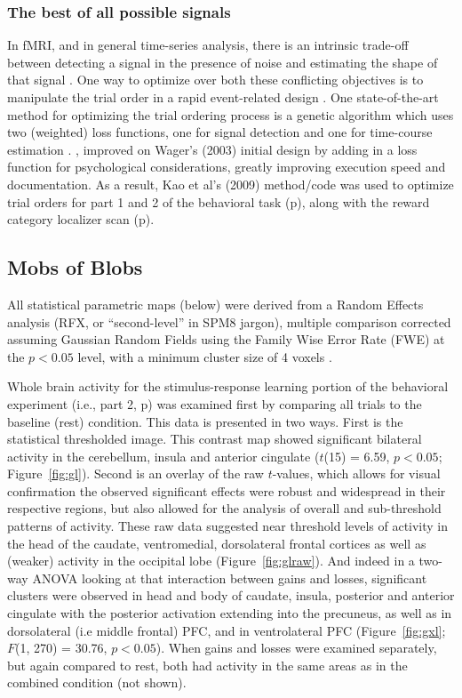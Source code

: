 \documentclass[doc,12pt]{apa}        %
\begin{document}
\subsubsection{The best of all possible signals}
\label{subsub:bestsignal}
In fMRI, and in general time-series analysis, there is an intrinsic trade-off between detecting a signal in the presence of noise and estimating the shape of that signal \cite{Dale:1999p7901,Birn:2002p1777,Liu:2004p2141}.   One way to optimize over both these conflicting objectives is to manipulate the trial order in a rapid event-related design \cite{Miezin:2000p7924}.  One state-of-the-art method for optimizing the trial ordering process is a genetic algorithm which uses two (weighted) loss functions, one for signal detection and one for time-course estimation \cite{Wager:2003p2980}. , improved on Wager's (2003) initial design by adding in a loss function for psychological considerations, greatly improving execution speed and documentation.  As a result, Kao et al's (2009) method/code was used to optimize trial orders for part 1 and 2 of the behavioral task (p\pageref{subsub:whatwhen}), along with the reward category localizer scan (p\pageref{subsub:datadetails}).

\subsection{Mobs of Blobs}
\label{sub:blob}
All statistical parametric maps (below) were derived from a Random Effects analysis (RFX, or ``second-level'' in SPM8 jargon), multiple comparison corrected assuming Gaussian Random Fields using the Family Wise Error Rate (FWE) at the $p < 0.05$ level, with a minimum cluster size of 4 voxels \cite{Worsley:1996p9367}. 

Whole brain activity for the stimulus-response learning portion of the behavioral experiment (i.e., part 2, p\pageref{subsub:whatwhen}) was examined first by comparing all trials to the baseline (rest) condition.  This data is presented in two ways. First is the statistical thresholded image.  This contrast map showed significant bilateral activity in the cerebellum, insula and anterior cingulate ($t$(15) = 6.59, $p< 0.05$; Figure~\ref{fig:gl}).  Second is an overlay of the raw $t$-values, which allows for visual confirmation the observed significant effects were robust and widespread in their respective regions, but also allowed for the analysis of overall and sub-threshold patterns of activity.  These raw data suggested near threshold levels of activity in the head of the caudate, ventromedial, dorsolateral frontal cortices as well as (weaker) activity in the occipital lobe (Figure~\ref{fig:glraw}).  And indeed in a two-way ANOVA looking at that interaction between gains and losses, significant clusters were observed in head and body of caudate, insula, posterior and anterior cingulate with the posterior activation extending into the precuneus, as well as in dorsolateral (i.e middle frontal) PFC, and in ventrolateral PFC (Figure~\ref{fig:gxl}; $F$(1, 270) = 30.76, $p < 0.05$).  When gains and losses were examined separately, but again compared to rest, both had activity in the same areas as in the combined condition (not shown).
\end{document}
